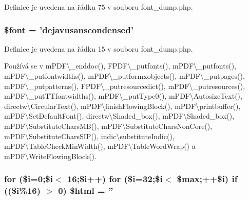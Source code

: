 Definice je uvedena na řádku 75 v souboru font\-\_\-dump.\-php.

\hypertarget{font__dump_8php_a9d63b61d7d442048fe453731932c6aed}{
\subsubsection[{\$font}]{\setlength{\rightskip}{0pt plus 5cm}\$font = 'dejavusanscondensed'}}\label{font__dump_8php_a9d63b61d7d442048fe453731932c6aed}


Definice je uvedena na řádku 15 v souboru font\-\_\-dump.\-php.



Používá se v m\-P\-D\-F\textbackslash{}\-\_\-enddoc(), F\-P\-D\-F\textbackslash{}\-\_\-putfonts(), m\-P\-D\-F\textbackslash{}\-\_\-putfonts(), m\-P\-D\-F\textbackslash{}\-\_\-putfontwidths(), m\-P\-D\-F\textbackslash{}\-\_\-putformxobjects(), m\-P\-D\-F\textbackslash{}\-\_\-putpages(), m\-P\-D\-F\textbackslash{}\-\_\-putpatterns(), F\-P\-D\-F\textbackslash{}\-\_\-putresourcedict(), m\-P\-D\-F\textbackslash{}\-\_\-putresources(), m\-P\-D\-F\textbackslash{}\-\_\-put\-T\-Tfontwidths(), m\-P\-D\-F\textbackslash{}\-\_\-put\-Type0(), m\-P\-D\-F\textbackslash{}\-Autosize\-Text(), directw\textbackslash{}\-Circular\-Text(), m\-P\-D\-F\textbackslash{}finish\-Flowing\-Block(), m\-P\-D\-F\textbackslash{}printbuffer(), m\-P\-D\-F\textbackslash{}\-Set\-Default\-Font(), directw\textbackslash{}\-Shaded\-\_\-box(), m\-P\-D\-F\textbackslash{}\-Shaded\-\_\-box(), m\-P\-D\-F\textbackslash{}\-Substitute\-Chars\-M\-B(), m\-P\-D\-F\textbackslash{}\-Substitute\-Chars\-Non\-Core(), m\-P\-D\-F\textbackslash{}\-Substitute\-Chars\-S\-I\-P(), indic\textbackslash{}substitute\-Indic(), m\-P\-D\-F\textbackslash{}\-Table\-Check\-Min\-Width(), m\-P\-D\-F\textbackslash{}\-Table\-Word\-Wrap() a m\-P\-D\-F\textbackslash{}\-Write\-Flowing\-Block().

\hypertarget{font__dump_8php_ac4bf829c24b00f00ff9d3498539e1f4b}{
\subsubsection[{\$html}]{\setlength{\rightskip}{0pt plus 5cm}for (\$i=0;\$i$<$ 16;\$i++) for (\$i=32;\$i$<$ \$max;++\$i) {\bf if} ((\$i\%16) $>$ 0) \$html = ''}}\label{font__dump_8php_ac4bf829c24b00f00ff9d3498539e1f4b}


